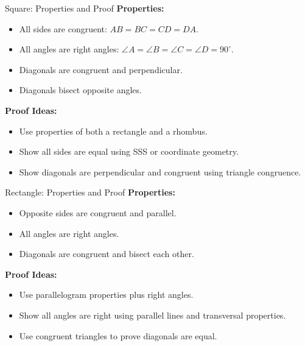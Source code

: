 \documentclass{beamer}
\begin{document}
\begin{frame}{Square: Properties and Proof}
\textbf{Properties:}
\begin{itemize}
    \item All sides are congruent: $AB = BC = CD = DA$.
    \item All angles are right angles: $\angle A = \angle B = \angle C = \angle D = 90^\circ$.
    \item Diagonals are congruent and perpendicular.
    \item Diagonals bisect opposite angles.
\end{itemize}

\vspace{1em}
\textbf{Proof Ideas:}
\begin{itemize}
    \item Use properties of both a rectangle and a rhombus.
    \item Show all sides are equal using SSS or coordinate geometry.
    \item Show diagonals are perpendicular and congruent using triangle congruence.
\end{itemize}
\end{frame}

\begin{frame}{Rectangle: Properties and Proof}
\textbf{Properties:}
\begin{itemize}
    \item Opposite sides are congruent and parallel.
    \item All angles are right angles.
    \item Diagonals are congruent and bisect each other.
\end{itemize}

\vspace{1em}
\textbf{Proof Ideas:}
\begin{itemize}
    \item Use parallelogram properties plus right angles.
    \item Show all angles are right using parallel lines and transversal properties.
    \item Use congruent triangles to prove diagonals are equal.
\end{itemize}
\end{frame}
\end{document}
